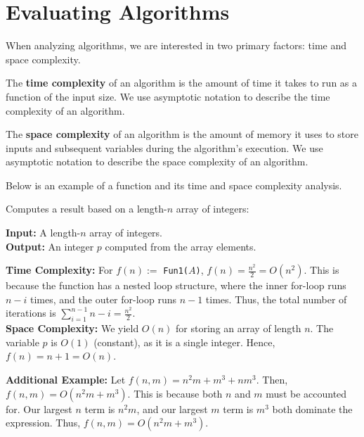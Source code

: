 \newpage 
\section{Evaluating Algorithms}
\noindent
When analyzing algorithms, we are interested in two primary factors: time and space complexity.

\begin{Def}
    
        The \textbf{time complexity} of an algorithm is the amount of time it takes to run as a function of the input size. We use asymptotic notation to describe the time complexity of an algorithm.
\end{Def}

\begin{Def}
    
        The \textbf{space complexity} of an algorithm is the amount of memory it uses to store inputs and subsequent variables during the algorithm's execution. We use asymptotic notation to describe the space complexity of an algorithm.
\end{Def}
\noindent
Below is an example of a function and its time and space complexity analysis.

\begin{Func}
    Computes a result based on a length-$n$ array of integers:

    \vspace{.5em}
    \noindent
    \textbf{Input: } A length-$n$ array of integers.\\
    \textbf{Output: } An integer $p$ computed from the array elements.\\
    \begin{algorithm}[H]
        \SetAlgoLined
        
        \vspace{.5em}
    \end{algorithm}

    \noindent
    \textbf{Time Complexity:} For $f(n):=$ \texttt{Fun1($A$)}, $f(n)=\frac{n^2}{2}=O(n^2)$. This is because the function has a nested loop structure, where the inner for-loop runs $n-i$ times, and the outer for-loop runs $n-1$ times. Thus, the total number of iterations is $\sum_{i=1}^{n-1}n-i=\frac{n^2}{2}$.\\

    \noindent
    \textbf{Space Complexity:} We yield $O(n)$ for storing an array of length $n$. The variable $p$ is $O(1)$ (constant), as it is a single integer. Hence, $f(n)=n+1=O(n)$.
    \end{Func}   

    \noindent
    \textbf{Additional Example:} Let $f(n,m) = n^2m + m^3 + nm^3$. Then, $f(n,m)=O(n^2m+m^3)$. This is because both $n$ and $m$ must be accounted for. Our largest $n$ term is $n^2m$, and our largest $m$ term is $m^3$ both dominate the expression. Thus, $f(n,m)=O(n^2m+m^3)$.



